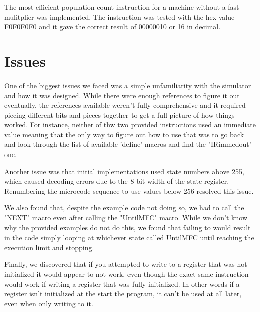 \documentclass[acmtog]{acmart}
\begin{document}
The most efficient population count instruction for a machine without a fast mulitplier was implemented. The instruction was tested with the hex value F0F0F0F0 and it gave the correct result of 00000010 or 16 in decimal.

\section{Issues}
One of the biggest issues we faced was a simple unfamiliarity with the simulator and how it was designed. While there were enough references to figure it out
eventually, the references available weren't fully comprehensive and it required piecing different bits and pieces together to get a full picture of how things
worked. For instance, neither of thw two provided instructions used an immediate value meaning that the only way to figure out how to use that was to go back 
and look through the list of available 'define' macros and find the "IRimmedout" one.

Another issue was that initial implementations used state numbers above 255, which caused decoding errors due to the 8‑bit width of the state register. Renumbering the microcode sequence to use values below 256 resolved this issue.

We also found that, despite the example code not doing so, we had to call the "NEXT" macro even after calling the "UntilMFC" macro. While we don't know why the provided examples do not do this, we found that failing to would result in the code simply looping at whichever state called UntilMFC until reaching the execution limit and stopping. 

Finally, we discovered that if you attempted to write to a register that was not initialized it would appear to not work, even though the exact same instruction would work if writing a register that was fully initialized. In other words if a register isn't initialized at the start the program, it can't be used at all later, even when only writing to it.
\end{document}
